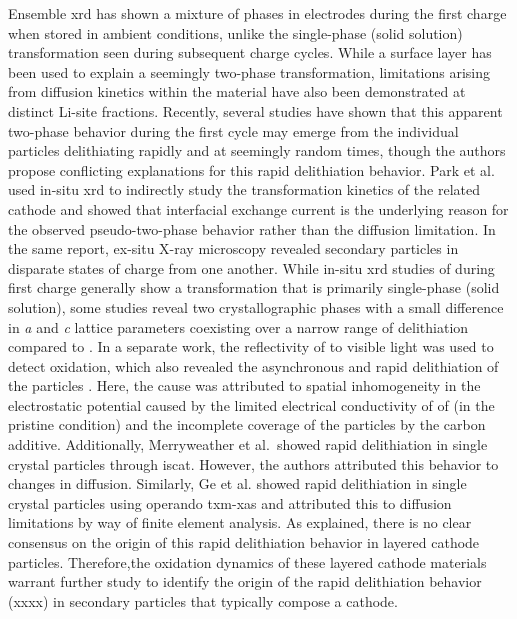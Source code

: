 \documentclass{article}
\begin{document}
Ensemble \gls{xrd} has shown a mixture of phases in \nca{} electrodes
during the first charge when stored in ambient conditions, unlike the
single-phase (solid solution) transformation seen during subsequent
charge cycles\cite{robert2015}. While a  surface layer has
been used to explain a seemingly two-phase
transformation\cite{grenier2017}, limitations arising from diffusion
kinetics within the material have also been demonstrated at distinct
Li-site fractions\cite{chapman2020}. Recently, several studies have
shown that this apparent two-phase behavior during the first cycle may
emerge from the individual particles delithiating rapidly and at
seemingly random times\cite{chueh2021, zhao2022, rao2021, wang2020-6},
though the authors propose conflicting explanations for this rapid
delithiation behavior. Park et al. \cite{chueh2021} used in-situ
\gls{xrd} to indirectly study the transformation kinetics of the
related \nmc[333]{} cathode and showed that interfacial exchange
current is the underlying reason for the observed pseudo-two-phase
behavior rather than the  diffusion limitation. In the same
report, ex-situ X-ray microscopy revealed secondary particles in
disparate states of charge from one another. While in-situ \gls{xrd}
studies of \nmc[333]{} during first charge generally show a
transformation that is primarily single-phase (solid
solution)\cite{hulzen2018,ahn2017,zhou2016-2}, some studies reveal two
crystallographic phases with a small difference in \emph{a} and
\emph{c} lattice parameters coexisting over a narrow range of
delithiation compared to \nca{}\cite{yoon2006,hua2018}. In a separate
work, the reflectivity of \nmc[532]{} to visible light was used to
detect oxidation, which also revealed the asynchronous and rapid
delithiation of the \nmc[532]{} particles \cite{zhao2022}. Here, the
cause was attributed to spatial inhomogeneity in the electrostatic
potential caused by the limited electrical conductivity of of
\nmc[532]{} (in the pristine condition) and the incomplete coverage of
the \nmc[532]{} particles by the carbon additive. Additionally,
Merryweather et al.\cite{rao2021}\ showed rapid delithiation in
 single crystal particles through \gls{iscat}. However, the
authors attributed this behavior to changes in 
diffusion. Similarly, Ge et al.\cite{wang2020-6} showed rapid
delithiation in \nmc{} single crystal particles using operando
\gls{txm}-\gls{xas} and attributed this to  diffusion
limitations by way of finite element analysis. As explained, there is
no clear consensus on the origin of this rapid delithiation behavior
in layered cathode particles. Therefore,the oxidation dynamics of
these layered cathode materials warrant further study to identify the
origin of the rapid delithiation behavior (xxxx) in secondary
particles that typically compose a cathode.
\end{document}
